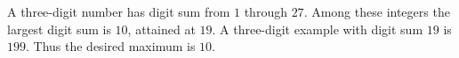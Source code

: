 A three-digit number has digit sum from $1$ through $27$. Among these integers the largest digit sum is $10$, attained at $19$. A three-digit example with digit sum $19$ is $199$. Thus the desired maximum is $\boxed{10}$.
